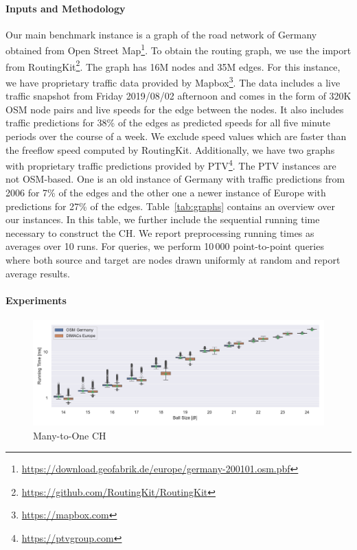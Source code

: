 \documentclass[manuscript,review]{acmart}
\begin{document}
\paragraph{Inputs and Methodology}
Our main benchmark instance is a graph of the road network of Germany obtained from Open Street Map\footnote{\url{https://download.geofabrik.de/europe/germany-200101.osm.pbf}}.
To obtain the routing graph, we use the import from RoutingKit\footnote{\url{https://github.com/RoutingKit/RoutingKit}}.
The graph has 16M nodes and 35M edges.
For this instance, we have proprietary traffic data provided by Mapbox\footnote{\url{https://mapbox.com}}.
The data includes a live traffic snapshot from Friday 2019/08/02 afternoon and comes in the form of 320K OSM node pairs and live speeds for the edge between the nodes.
It also includes traffic predictions for 38\% of the edges as predicted speeds for all five minute periods over the course of a week.
We exclude speed values which are faster than the freeflow speed computed by RoutingKit.
Additionally, we have two graphs with proprietary traffic predictions provided by PTV\footnote{\url{https://ptvgroup.com}}.
The PTV instances are not OSM-based.
One is an old instance of Germany with traffic predictions from 2006 for 7\% of the edges and the other one a newer instance of Europe with predictions for 27\% of the edges.
Table~\ref{tab:graphs} contains an overview over our instances.
In this table, we further include the sequential running time necessary to construct the CH.
We report preprocessing running times as averages over 10 runs.
For queries, we perform 10\,000 point-to-point queries where both source and target are nodes drawn uniformly at random and report average results.

\paragraph{Experiments}

\begin{figure}
\centering
\includegraphics[width=\linewidth]{fig/lazy_rphast_many_to_one.pdf}
\caption{
Many-to-One CH
}\label{fig:many_to_one}
\end{figure}
\end{document}
